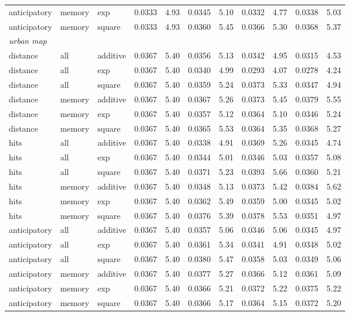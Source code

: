 \begin{tabular}{lllcccccccc}
anticipatory & memory & exp & 0.0333 & 4.93 & 0.0345 & 5.10 & 0.0332 & 4.77 & 0.0338 & 5.03 \\
anticipatory & memory & square & 0.0333 & 4.93 & 0.0360 & 5.45 & 0.0366 & 5.30 & 0.0368 & 5.37 \\
\multicolumn{11}{l}{\emph{urban map}} \\
distance & all & additive & 0.0367 & 5.40 & 0.0356 & 5.13 & 0.0342 & 4.95 & 0.0315 & 4.53 \\
distance & all & exp & 0.0367 & 5.40 & 0.0340 & 4.99 & 0.0293 & 4.07 & 0.0278 & 4.24 \\
distance & all & square & 0.0367 & 5.40 & 0.0359 & 5.24 & 0.0373 & 5.33 & 0.0347 & 4.94 \\
distance & memory & additive & 0.0367 & 5.40 & 0.0367 & 5.26 & 0.0373 & 5.45 & 0.0379 & 5.55 \\
distance & memory & exp & 0.0367 & 5.40 & 0.0357 & 5.12 & 0.0364 & 5.10 & 0.0346 & 5.24 \\
distance & memory & square & 0.0367 & 5.40 & 0.0365 & 5.53 & 0.0364 & 5.35 & 0.0368 & 5.27 \\
hits & all & additive & 0.0367 & 5.40 & 0.0338 & 4.91 & 0.0369 & 5.26 & 0.0345 & 4.74 \\
hits & all & exp & 0.0367 & 5.40 & 0.0344 & 5.01 & 0.0346 & 5.03 & 0.0357 & 5.08 \\
hits & all & square & 0.0367 & 5.40 & 0.0371 & 5.23 & 0.0393 & 5.66 & 0.0360 & 5.21 \\
hits & memory & additive & 0.0367 & 5.40 & 0.0348 & 5.13 & 0.0373 & 5.42 & 0.0384 & 5.62 \\
hits & memory & exp & 0.0367 & 5.40 & 0.0362 & 5.49 & 0.0359 & 5.00 & 0.0345 & 5.02 \\
hits & memory & square & 0.0367 & 5.40 & 0.0376 & 5.39 & 0.0378 & 5.53 & 0.0351 & 4.97 \\
anticipatory & all & additive & 0.0367 & 5.40 & 0.0357 & 5.06 & 0.0346 & 5.06 & 0.0345 & 4.97 \\
anticipatory & all & exp & 0.0367 & 5.40 & 0.0361 & 5.34 & 0.0341 & 4.91 & 0.0348 & 5.02 \\
anticipatory & all & square & 0.0367 & 5.40 & 0.0380 & 5.47 & 0.0358 & 5.03 & 0.0349 & 5.06 \\
anticipatory & memory & additive & 0.0367 & 5.40 & 0.0377 & 5.27 & 0.0366 & 5.12 & 0.0361 & 5.09 \\
anticipatory & memory & exp & 0.0367 & 5.40 & 0.0366 & 5.21 & 0.0372 & 5.22 & 0.0375 & 5.22 \\
anticipatory & memory & square & 0.0367 & 5.40 & 0.0366 & 5.17 & 0.0364 & 5.15 & 0.0372 & 5.20 \\
\bottomrule
\end{tabular}
